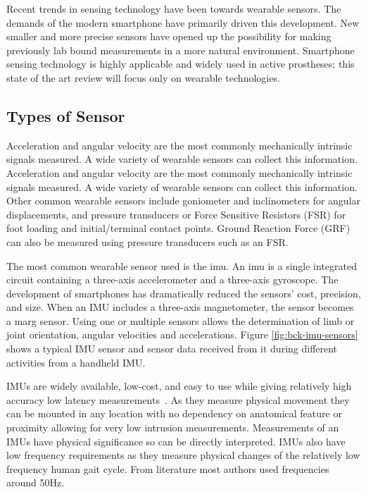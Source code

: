 Recent trends in sensing technology have been towards wearable sensors. The demands of the modern smartphone have primarily driven this development. New smaller and more precise sensors have opened up the possibility for making previously lab bound measurements in a more natural environment. Smartphone sensing technology is highly applicable and widely used in active prostheses\cite{Asif2021}; this state of the art review will focus only on wearable technologies.

\subsection{Types of Sensor}
Acceleration and angular velocity are the most commonly mechanically intrinsic signals measured. A wide variety of wearable sensors can collect this information.\cite{Shull2014, Tucker2015} Acceleration and angular velocity are the most commonly mechanically intrinsic signals measured. A wide variety of wearable sensors can collect this information. Other common wearable sensors include goniometer and inclinometers for angular displacements, and pressure transducers or Force Sensitive Resistors (FSR) for foot loading and initial/terminal contact points. Ground Reaction Force (GRF) can also be measured using pressure transducers such as an FSR\cite{Schepers2007}.

The most common wearable sensor used is the \acrfull{imu}\cite{Shull2014}. An \acrshort{imu} is a single integrated circuit containing a three-axis accelerometer and a three-axis gyroscope. The development of smartphones has dramatically reduced the sensors' cost, precision, and size. When an IMU includes a three-axis magnetometer, the sensor becomes a \acrfull{marg} sensor. Using one or multiple sensors allows the determination of limb or joint orientation, angular velocities and accelerations. Figure \ref{fig:bck-imu-sensors} shows a typical IMU sensor and sensor data received from it during different activities from a handheld IMU.

IMUs are widely available, low-cost, and easy to use while giving relatively high accuracy low latency measurements~\cite{Wittmann2019, Bangaru2020}. As they measure physical movement they can be mounted in any location with no dependency on anatomical feature or proximity allowing for very low intrusion measurements\cite{Bangaru2020}. Measurements of an IMUs have physical significance so can be directly interpreted\cite{Godiyal2018a}. IMUs also have low frequency requirements as they measure physical changes of the relatively low frequency human gait cycle. From literature most authors used frequencies around 50Hz\cite{Wang2020, Sabatini2014, Eyobu2018, Su2020, Ordonez2016}.

